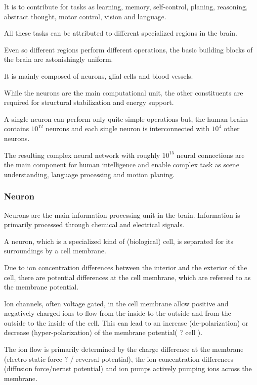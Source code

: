 It is to contribute for tasks as learning, memory, self-control, planing, reasoning, abstract thought, motor control, vision and language.

All these tasks can be attributed to different specialized regions in the brain. 

Even so different regions perform different operations, the basic building blocks of the brain are astonishingly uniform. 

It is mainly composed of neurons, glial cells and blood vessels.

While the neurons are the main computational unit, the other constituents are required for structural stabilization and energy support.

A single neuron can perform only quite simple operations but, the human brains contains $10^{12}$ neurons and each single neuron is interconnected with $10^{4}$ other neurons.

The resulting complex neural network with roughly $10^{15}$ neural connections are the main component for human intelligence and enable complex task as scene understanding, language processing and motion planing.

\subsubsection{Neuron}

Neurons are the main information processing unit in the brain. 
Information is primarily processed through chemical and electrical signals.

A neuron, which is a specialized kind of (biological) cell, is separated for its surroundings by a cell membrane.   

Due to ion concentration differences between the interior and the exterior of the cell, there are potential differences at the cell membrane, which are refereed to as the membrane potential. 


Ion channels, often voltage gated, in the cell membrane allow positive and negatively charged ions to flow from the inside to the outside and from the outside to the inside of the cell.
This can lead to an increase (de-polarization) or decrease (hyper-polarization) of the membrane potential( ? cell ).

The ion flow is primarily determined by the charge difference at the membrane (electro static force ? / reversal potential), the ion concentration differences (diffusion force/nernst potential) and ion pumps actively pumping ions across the membrane.

